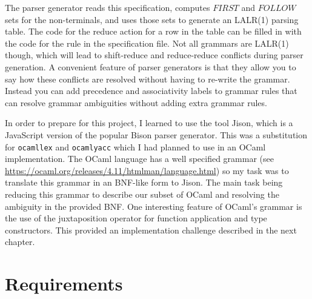 \documentclass[12pt,a4paper,twoside,openright]{report}
\begin{document}
The parser generator reads this specification, computes $FIRST$ and $FOLLOW$ sets for the non-terminals, and uses those sets to generate an LALR(1) parsing table.
The code for the reduce action for a row in the table can be filled in with the code for the rule in the specification file.
Not all grammars are LALR(1) though, which will lead to shift-reduce and reduce-reduce conflicts during parser generation.
A convenient feature of parser generators is that they allow you to say how these conflicts are resolved without having to re-write the grammar.
Instead you can add precedence and associativity labels to grammar rules that can resolve grammar ambiguities without adding extra grammar rules.

In order to prepare for this project, I learned to use the tool Jison, which is a JavaScript version of the popular Bison parser generator.
This was a substitution for {\tt ocamllex} and {\tt ocamlyacc} which I had planned to use in an OCaml implementation.
The OCaml language has a well specified grammar (see \url{https://ocaml.org/releases/4.11/htmlman/language.html}) so my task was to translate this grammar in an BNF-like form to Jison.
The main task being reducing this grammar to describe our subset of OCaml and resolving the ambiguity in the provided BNF.
One interesting feature of OCaml's grammar is the use of the juxtaposition operator for function application and type constructors.
This provided an implementation challenge described in the next chapter.

\section{Requirements}
\end{document}
